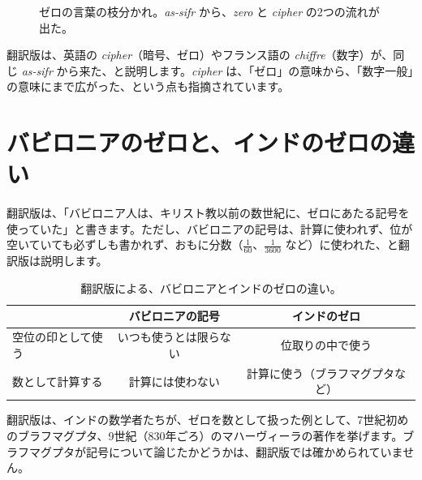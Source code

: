 \documentclass[a4paper,11pt,openany]{ltjsbook}
\begin{document}
\begin{figure}[htbp]
\centering
{}
\caption{ゼロの言葉の枝分かれ。\textit{as-sifr} から、\textit{zero} と \textit{cipher} の2つの流れが出た。}
\end{figure}

翻訳版は、英語の \textit{cipher}（暗号、ゼロ）やフランス語の \textit{chiffre}（数字）が、同じ \textit{as-sifr} から来た、と説明します。\textit{cipher} は、「ゼロ」の意味から、「数字一般」の意味にまで広がった、という点も指摘されています。

\section{バビロニアのゼロと、インドのゼロの違い}

翻訳版は、「バビロニア人は、キリスト教以前の数世紀に、ゼロにあたる記号を使っていた」と書きます。ただし、バビロニアの記号は、計算に使われず、位が空いていても必ずしも書かれず、おもに分数（$\tfrac1{60}$、$\tfrac1{3600}$ など）に使われた、と翻訳版は説明します。

\begin{table}[htbp]
\centering
\begin{tabular}{lcc}
\toprule
 & バビロニアの記号 & インドのゼロ\\
\midrule
空位の印として使う & いつも使うとは限らない & 位取りの中で使う\\
数として計算する & 計算には使わない & 計算に使う（ブラフマグプタなど）\\
\bottomrule
\end{tabular}
\caption{翻訳版による、バビロニアとインドのゼロの違い。}
\end{table}

翻訳版は、インドの数学者たちが、ゼロを数として扱った例として、7世紀初めのブラフマグプタ、9世紀（830年ごろ）のマハーヴィーラの著作を挙げます。ブラフマグプタが記号について論じたかどうかは、翻訳版では確かめられていません。
\end{document}
